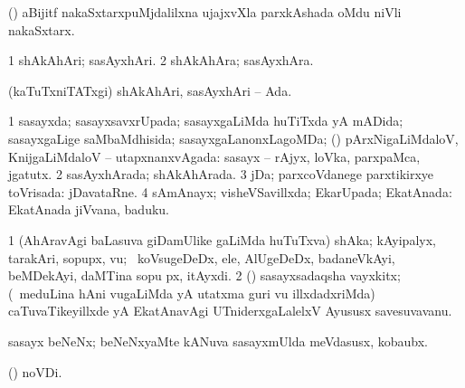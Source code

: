 \bentry
{} 
\gl{\nA}
\expl{}
\bmng
 (\Kavi) aBijitf nakaSxtarxpuMjdalilxna ujajxvXla parxkAshada oMdu niVli nakaSxtarx. 
\emng
\eentry

\bentry
{} 
\gl{\nA}
\expl{}
\bmng
\bnum
\num{1} shAkAhAri; sasAyxhAri. 
\num{2} shAkAhAra; sasAyxhAra. 
\enum
\emng
\eentry

\bentry
{} 
\gl{\gu}
\expl{}
\bmng
 (kaTuTxniTATxgi) shAkAhAri, sasAyxhAri -- Ada. 
\emng
\eentry

\bentry
{} 
\gl{\gu}
\expl{}
\bmng
\bnum
\num{1} sasayxda; sasayxsavxrUpada; sasayxgaLiMda huTiTxda yA mADida; sasayxgaLige saMbaMdhisida; sasayxgaLanonxLagoMDa; (\kanmu) pArxNigaLiMdaloV, KnijgaLiMdaloV -- utapxnanxvAgada:  sasayx -- rAjyx, loVka, parxpaMca, jgatutx. 
\num{2} sasAyxhArada; shAkAhArada. 
\num{3} jDa; parxcoVdanege parxtikirxye toVrisada:  jDavataRne. 
\num{4} sAmAnayx; visheVSavillxda; EkarUpada; EkatAnada:  EkatAnada jiVvana, baduku. 
\enum
\emng
\eentry

\bentry
{} 
\gl{\nA}
\expl{}
\bmng
\bnum
\num{1} (AhAravAgi baLasuva giDamUlike gaLiMda huTuTxva) shAka; kAyipalyx, tarakAri, sopupx, \mo vu; \udA\, koVsugeDeDx, ele, AlUgeDeDx, badaneVkAyi, beMDekAyi, daMTina sopu px, itAyxdi. 
\num{2} (\AmA) sasayxsadaqsha vayxkitx; (\kanmu\ meduLina hAni \mo vugaLiMda yA utatxma guri \mo vu illxdadxriMda) caTuvaTikeyillxde yA EkatAnavAgi UTniderxgaLalelxV Ayususx savesuvavanu. 
\enum
\emng
\eentry

\bentry
{}
\gl{\nA}
\expl{}
\bmng
 sasayx beNeNx; beNeNxyaMte kANuva sasayxmUlda meVdasusx, kobaubx. 
\emng
\eentry

\bentry
{}
\gl{\nA}
\expl{}
\bmng
{} (\pagu) noVDi. 
\emng
\eentry

\bentry
{}
\gl{\nA}
\expl{}
\bmng
\emng
\eentry

\bentry
{}
\gl{\nA}
\expl{}
\bmng
\emng
\eentry

